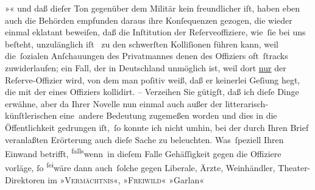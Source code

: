                   »\label{K_L04231-5v}\label{K_L04231-5}« und daß dieſer Ton gegenüber dem Militär kein freundlicher iſt,
               haben eben auch die Behörden empfunden {\kaufmannsund} daraus ihre
               Konſequenzen gezogen, die wieder einmal eklatant beweiſen, daß die Inſtitution der
               Reſerveoffiziere, wie ſie bei uns beſteht, unzulänglich iſt {\kaufmannsund} zu den schwerſten Kolliſionen führen kann, weil
                  die \introOben{}ſozialen\introOben{} Anſchauungen des Privatmannes denen des
               Offiziers oft ſtracks zuwiderlaufen; ein Fall, der in Deutschland unmöglich ist, weil dort \uline{nur} der
               Reſerve-Offizier wird, von dem man poſitiv weiß, daß er keinerlei Geſi{\geminationn}ung hegt, die mit der eines Offiziers kollidirt. –
                Verzeihen Sie gütigſt, daß ich dieſe Dinge erwähne, aber da {\pb}Ihrer
                  Novelle nun einmal auch außer der
               litterarisch-künſtlerischen eine \introOben{}andere\introOben{} Bedeutung zugemeßen worden  und dies in die Öffentlichkeit gedrungen \introOben{}iſt\introOben{}, ſo konnte ich nicht umhin, bei der durch Ihren Brief veranlaßten
               Erörterung  auch dieſe Sache zu beleuchten.
               Was ſpeziell Ihren Einwand betrifft, \substVorne{}\textsuperscript{falls}\substDazwischen{}wenn\substHinten{} in dieſem Falle Gehäſſigkeit gegen die Offiziere vorläge,{ }ſo \substVorne{}\textsuperscript{ſei}\substDazwischen{}wäre\substHinten{} dann \introOben{}auch\introOben{} ſolche gegen Liberale, Ärzte,
               Weinhändler, Theater-Direktoren im »\textsc{Vermächtnis}«, »\textsc{Freiwild}« {\kaufmannsund} »Garlan«
